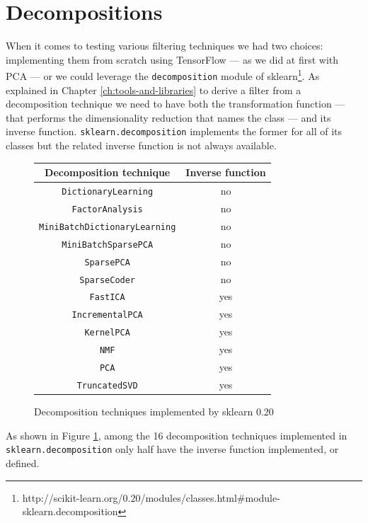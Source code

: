 \section{Decompositions}

When it comes to testing various filtering techniques we had two
choices: implementing them from scratch using TensorFlow --- as we did
at first with PCA --- or we could leverage the \texttt{decomposition}
module of
sklearn\footnote{http://scikit-learn.org/0.20/modules/classes.html\#module-sklearn.decomposition}.
As explained in Chapter \ref{ch:tools-and-libraries} to derive a filter
from a decomposition technique we need to have both the transformation
function --- that performs the dimensionality reduction that names the
class --- and its inverse function. \texttt{sklearn.decomposition}
implements the former for all of its classes but the related inverse
function is not always available.

\begin{figure}
  \centering
  \begin{tabular}{|c|c|}
    \hline
    Decomposition technique & Inverse function\\
    \hline
    \texttt{DictionaryLearning} & no \\
    \hline
    \texttt{FactorAnalysis} & no \\
    \hline
    \texttt{MiniBatchDictionaryLearning} & no \\
    \hline
    \texttt{MiniBatchSparsePCA} & no \\
    \hline
    \texttt{SparsePCA} & no \\
    \hline
    \texttt{SparseCoder} & no \\
    \hline
    \texttt{FastICA} & yes \\
    \hline
    \texttt{IncrementalPCA} & yes \\
    \hline
    \texttt{KernelPCA} & yes \\
    \hline
    \texttt{NMF} & yes \\
    \hline
    \texttt{PCA} & yes \\
    \hline
    \texttt{TruncatedSVD} & yes \\
    \hline
  \end{tabular}
  \caption{Decomposition techniques implemented by sklearn 0.20}
  \label{fig:decomposition-techniques}
\end{figure}

As shown in Figure \ref{fig:decomposition-techniques}, among the 16
decomposition techniques implemented in \texttt{sklearn.\-decomposition}
only half have the inverse function implemented, or defined.

